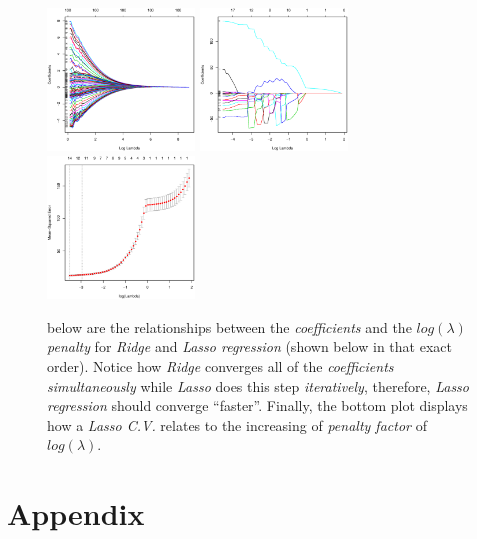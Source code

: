 \documentclass[a4paper, twocolumn]{article}
\begin{document}
    \begin{figure}[h!]
        \centering
        \caption{below are the relationships between the \emph{coefficients} and the \emph{$log(\lambda)$ penalty} for \emph{Ridge} and \emph{Lasso regression} (shown below in that exact order). Notice how \emph{Ridge} converges all of the \emph{coefficients simultaneously} while \emph{Lasso} does this step \emph{iteratively}, therefore, \emph{Lasso regression} should converge ``faster''. Finally, the bottom plot displays how a \emph{Lasso C.V.} relates to the increasing of \emph{penalty factor} of $log(\lambda)$.}
        \label{fig:lasso_ridge}
        \includegraphics[width=0.35\textwidth]{share/ridge.eps}
        \includegraphics[width=0.35\textwidth]{share/lasso.eps}
        \includegraphics[width=0.35\textwidth]{share/kfold.eps}
    \end{figure}

    \clearpage \nocite{*}
    
    

    \onecolumn \appendix
    \section*{Appendix}

    
    
    
    
\end{document}
